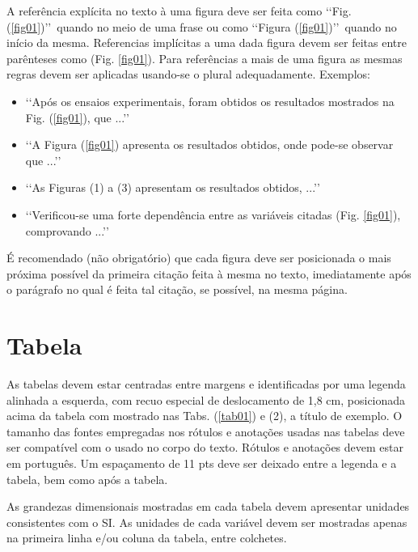 A referência explícita no texto à uma figura deve ser feita como 
\lq\lq Fig. (\ref{fig01})\rq\rq\ quando no meio de uma frase ou como 
\lq\lq Figura (\ref{fig01})\rq\rq\ quando no início da mesma. Referencias 
implícitas a uma dada figura devem ser feitas entre parênteses como 
(Fig. \ref{fig01}). Para referências a mais de uma figura as mesmas regras 
devem ser aplicadas usando-se o plural adequadamente. Exemplos:

\begin{itemize}
	\item \lq\lq Após os ensaios experimentais, foram obtidos os resultados 
	mostrados na Fig. (\ref{fig01}), que ...\rq\rq
	\item \lq\lq A Figura (\ref{fig01}) apresenta os resultados obtidos, onde 
	pode-se observar que ...\rq\rq
	\item \lq\lq As Figuras (1) a (3) apresentam os resultados obtidos, 
	...\rq\rq
	\item \lq\lq Verificou-se uma forte dependência entre as variáveis citadas 
	(Fig. \ref{fig01}), comprovando ...\rq\rq
\end{itemize}

É recomendado (não obrigatório) que cada figura deve ser posicionada o mais próxima possível da primeira citação feita à mesma no texto, imediatamente após o parágrafo no qual é feita tal citação, se possível, na mesma página.


\section{Tabela}

As tabelas devem estar centradas entre margens e identificadas por uma legenda alinhada a esquerda, com recuo especial de deslocamento de 1,8 cm, posicionada acima da tabela com mostrado nas Tabs. (\ref{tab01}) e (2), a título de exemplo. O tamanho das fontes empregadas nos rótulos e anotações usadas nas 
tabelas deve ser compatível com o usado no corpo do texto. Rótulos e anotações devem estar em português. Um espaçamento de 11 pts deve ser deixado entre a legenda e a tabela, bem como após a tabela.

As grandezas dimensionais mostradas em cada tabela devem apresentar unidades consistentes com o SI. As unidades de cada variável devem ser mostradas apenas na primeira linha e/ou coluna da tabela, entre colchetes.

